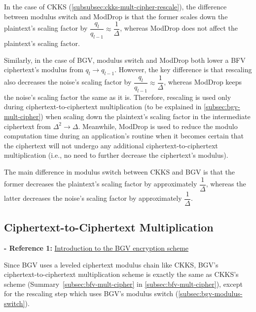 In the case of CKKS (\autoref{subsubsec:ckks-mult-cipher-rescale}), the difference between modulus switch and \textsf{ModDrop} is that the former scales down the plaintext's scaling factor by $\dfrac{q_l}{q_{l-1}} \approx \dfrac{1}{\Delta}$, whereas \textsf{ModDrop} does not affect the plaintext's scaling factor. 

Similarly, in the case of BGV, modulus switch and \textsf{ModDrop} both lower a BFV ciphertext's modulus from $q_l \rightarrow q_{l-1}$. However, the key difference is that rescaling also decreases the noise's scaling factor by $\dfrac{q_l}{q_{l-1}} \approx \dfrac{1}{\Delta}$, whereas \textsf{ModDrop} keeps the noise's scaling factor the same as it is. Therefore, rescaling is used only during ciphertext-to-ciphertext multiplication (to be explained in \autoref{subsec:bgv-mult-cipher}) when scaling down the plaintext's scaling factor in the intermediate ciphertext from $\Delta^2 \rightarrow \Delta$. Meanwhile, \textsf{ModDrop} is used to reduce the modulo computation time during an application's routine when it becomes certain that the ciphertext will not undergo any additional ciphertext-to-ciphertext multiplication (i.e., no need to further decrease the ciphertext's modulus). 

The main difference in modulus switch between CKKS and BGV is that the former decreases the plaintext's scaling factor by approximately $\dfrac{1}{\Delta}$, whereas the latter decreases the noise's scaling factor by approximately $\dfrac{1}{\Delta}$. 


\subsection{Ciphertext-to-Ciphertext Multiplication}
\label{subsec:bgv-mult-cipher}

\noindent \textbf{- Reference 1:} 
\href{https://www.inferati.com/blog/fhe-schemes-bgv}{Introduction to the BGV encryption scheme}

Since BGV uses a leveled ciphertext modulus chain like CKKS, BGV's ciphertext-to-ciphertext multiplication scheme is exactly the same as CKKS's scheme (Summary~\ref*{subsec:bfv-mult-cipher} in \autoref{subsec:bfv-mult-cipher}), except for the rescaling step which uses BGV's modulus switch (\autoref{subsec:bgv-modulus-switch}). 

